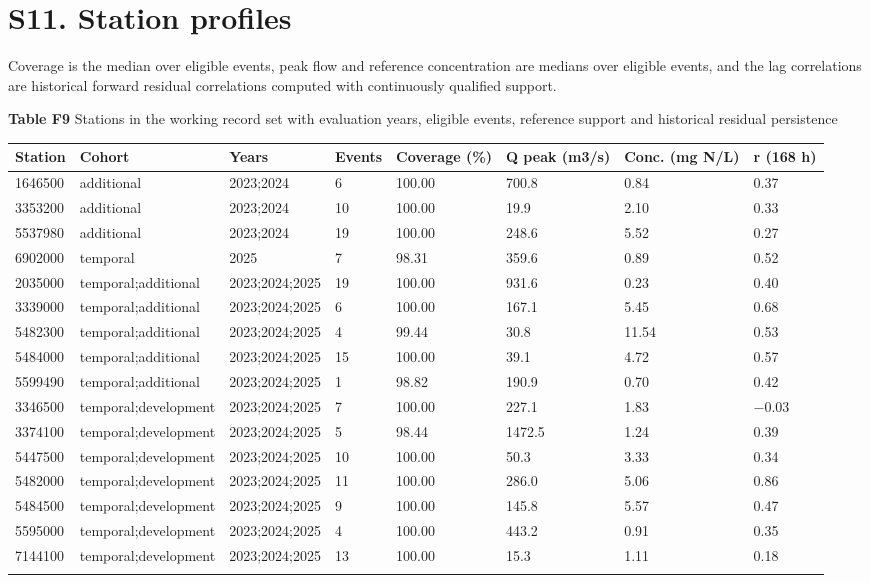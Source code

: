 \documentclass[lineno,pdflatex,sn-apa]{sn-jnl}%
\theoremstyle{thmstyleone}%
\theoremstyle{thmstyletwo}%
\theoremstyle{thmstylethree}%
\begin{document}
\section*{S11. Station profiles}

Coverage is the median over eligible events, peak flow and reference concentration are medians over eligible events, and the lag correlations are historical forward residual correlations computed with continuously qualified support.

\begin{center}
\noindent\textbf{Table F9} Stations in the working record set with evaluation years, eligible events, reference support and historical residual persistence
\end{center}

\begin{center}
\footnotesize
\setlength{\tabcolsep}{2pt}
\begin{tabular}{@{}p{}p{}p{}p{}p{}p{}p{}p{}@{}}
\toprule
Station & Cohort & Years & Events & Coverage (\%) & Q peak (m3/s) & Conc. (mg N/L) & r (168 h)\\
\midrule
1646500 & additional & 2023;2024 & 6 & 100.00 & 700.8 & 0.84 & 0.37\\
3353200 & additional & 2023;2024 & 10 & 100.00 & 19.9 & 2.10 & 0.33\\
5537980 & additional & 2023;2024 & 19 & 100.00 & 248.6 & 5.52 & 0.27\\
6902000 & temporal & 2025 & 7 & 98.31 & 359.6 & 0.89 & 0.52\\
2035000 & temporal;additional & 2023;2024;2025 & 19 & 100.00 & 931.6 & 0.23 & 0.40\\
3339000 & temporal;additional & 2023;2024;2025 & 6 & 100.00 & 167.1 & 5.45 & 0.68\\
5482300 & temporal;additional & 2023;2024;2025 & 4 & 99.44 & 30.8 & 11.54 & 0.53\\
5484000 & temporal;additional & 2023;2024;2025 & 15 & 100.00 & 39.1 & 4.72 & 0.57\\
5599490 & temporal;additional & 2023;2024;2025 & 1 & 98.82 & 190.9 & 0.70 & 0.42\\
3346500 & temporal;development & 2023;2024;2025 & 7 & 100.00 & 227.1 & 1.83 & $-$0.03\\
3374100 & temporal;development & 2023;2024;2025 & 5 & 98.44 & 1472.5 & 1.24 & 0.39\\
5447500 & temporal;development & 2023;2024;2025 & 10 & 100.00 & 50.3 & 3.33 & 0.34\\
5482000 & temporal;development & 2023;2024;2025 & 11 & 100.00 & 286.0 & 5.06 & 0.86\\
5484500 & temporal;development & 2023;2024;2025 & 9 & 100.00 & 145.8 & 5.57 & 0.47\\
5595000 & temporal;development & 2023;2024;2025 & 4 & 100.00 & 443.2 & 0.91 & 0.35\\
7144100 & temporal;development & 2023;2024;2025 & 13 & 100.00 & 15.3 & 1.11 & 0.18\\
\botrule
\end{tabular}
\end{center}


\end{document}
